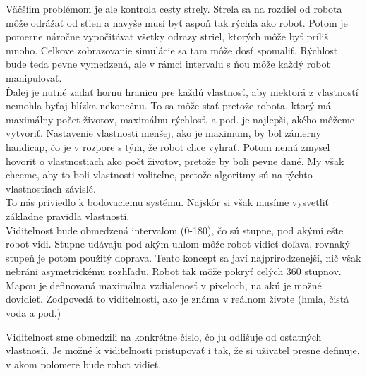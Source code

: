 Väčšíim problémom je  ale kontrola cesty strely. Strela sa na rozdiel od robota môže odrážať od stien a navyše musí byť aspoň tak rýchla ako robot. Potom je pomerne náročne vypočitávat všetky odrazy striel, ktorých môže byť príliš mnoho. Celkove zobrazovanie simulácie sa tam môže dosť spomaliť. Rýchlost bude teda pevne vymedzená, ale v rámci intervalu s ňou môže každý robot manipulovať.\\
Ďalej je nutné  zadať hornu hranicu pre každú vlastnosť, aby niektorá z vlastností nemohla byťaj blízka nekonečnu. To sa môže stať pretože robota, ktorý má maximálny počet životov, maximálnu rýchlosť. a pod. je najlepši, akého môžeme vytvoriť. Nastavenie vlastnosti menšej, ako je maximum, by bol zámerny handicap, čo je v rozpore s tým, že robot chce vyhrať. Potom nemá zmysel hovoriť o vlastnostiach ako počt životov, pretože by boli pevne dané. My však chceme, aby to boli vlastnosti voliteľne, pretože algoritmy sú na týchto vlastnostiach závislé. \\ %
To nás priviedlo k bodovaciemu  systému. 
Najskôr si však musíme vysvetliť základne pravidla vlastností.\\

Viditeľnost bude obmedzená intervalom (0-180), čo sú stupne, pod akými ešte robot vidi. Stupne udávaju pod akým uhlom môže robot vidieť doľava, rovnaký stupeň je potom použitý doprava. Tento koncept sa javí najprirodzenejší, nič však nebráni asymetrickému rozhľadu. Robot tak môže pokryť celých 360 stupnov.\\
Mapou je definovaná maximálna vzdialenosť v pixeloch, na akú je možné dovidieť. Zodpovedá to viditeľnosti, ako je známa v reálnom živote (hmla, čistá voda a pod.)

Viditeľnost sme obmedzili na konkrétne čislo, čo ju odlišuje od ostatných vlastnosíi. Je možné k viditeľnosti pristupovať i tak, že si uživateľ presne definuje, v akom polomere bude robot vidieť.

